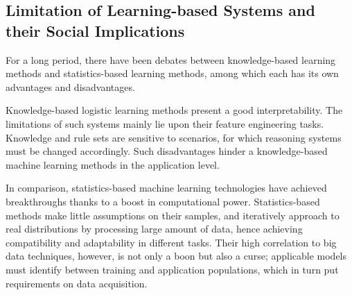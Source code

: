 \documentclass[letterpaper, twocolumn, 10pt, conference]{IEEEtran}
\begin{document}
                
\subsection{Limitation of Learning-based Systems and their Social Implications}
\label{ssec:AI.limitation}
                
For a long period, there have been debates between knowledge-based learning methods and statistics-based learning methods, among which each has its own advantages and disadvantages. 

Knowledge-based logistic learning methods present a good interpretability. The limitations of such systems mainly lie upon their feature engineering tasks. Knowledge and rule sets are sensitive to scenarios, for which reasoning systems must be changed accordingly. Such disadvantages hinder a knowledge-based machine learning methods in the application level.
                
In comparison, statistics-based machine learning technologies have achieved breakthroughs thanks to a boost in computational power. Statistics-based methods make little assumptions on their samples, and iteratively approach to real distributions by processing large amount of data, hence achieving compatibility and adaptability in different tasks. Their high correlation to big data techniques, however, is not only a boon but also a curse; applicable models must identify between training and application populations, which in turn put requirements on data acquisition. 
                
\end{document}
